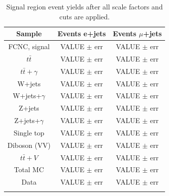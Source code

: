 \begin{table}[h!]
\begin{center}
{\renewcommand{\arraystretch}{1.2}
\begin{tabular}{ccc}
\hhline{===}
Sample  &  Events e+jets   & Events $\mu$+jets   \\  \hline 
FCNC, signal			& VALUE $\pm$ err & VALUE $\pm$ err\\
$t\bar{t}$            		& VALUE $\pm$ err & VALUE $\pm$ err\\
$t\bar{t}+\gamma$           & VALUE $\pm$ err & VALUE $\pm$ err\\
W+jets			& VALUE $\pm$ err & VALUE $\pm$ err\\   
W+jets+$\gamma$		& VALUE $\pm$ err & VALUE $\pm$ err\\
Z+jets	            	& VALUE $\pm$ err & VALUE $\pm$ err\\
Z+jets+$\gamma$		& VALUE $\pm$ err & VALUE $\pm$ err\\
Single top 		           & VALUE $\pm$ err & VALUE $\pm$ err\\
Diboson (VV)		          	& VALUE $\pm$ err & VALUE $\pm$ err\\
$t\bar{t}+V$	           & VALUE $\pm$ err & VALUE $\pm$ err\\ \hline
Total MC 			& VALUE $\pm$ err & VALUE $\pm$ err\\ \hline
Data		                     	& VALUE $\pm$ err & VALUE $\pm$ err\\ \hhline{===}
\end{tabular}
\caption{Signal region event yields after all scale factors and cuts are applied. }
\label{tab:SRYields}
}
\end{center}
\end{table}








